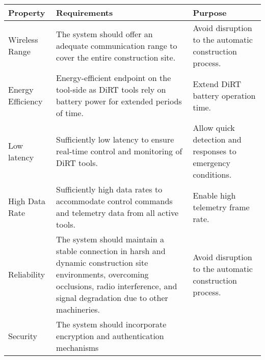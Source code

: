 \begin{table}[H]
\begin{adjustbox}{max width=\textwidth}
\begin{tabular}{p{2.33cm}p{8.25cm}p{5.34cm}}
\hline
\multicolumn{1}{|p{2.33cm}}{{\footnotesize \textbf{Property}}} & 
\multicolumn{1}{|p{8.25cm}}{{\footnotesize \textbf{Requirements}}} & 
\multicolumn{1}{|p{5.34cm}|}{{\footnotesize \textbf{Purpose}}} \\ 
\hline
\multicolumn{1}{|p{2.33cm}}{{\footnotesize Wireless Range}} & 
\multicolumn{1}{|p{8.25cm}}{{\footnotesize The system should offer an adequate communication range to cover the entire construction site. }} & 
\multicolumn{1}{|p{5.34cm}|}{{\footnotesize Avoid disruption to the automatic construction process.}} \\ 
\hline
\multicolumn{1}{|p{2.33cm}}{{\footnotesize Energy Efficiency}} & 
\multicolumn{1}{|p{8.25cm}}{{\footnotesize Energy-efficient endpoint on the tool-side as DiRT tools rely on battery power for extended periods of time.\par}} & 
\multicolumn{1}{|p{5.34cm}|}{{\footnotesize Extend DiRT battery operation time.}} \\ 
\hline
\multicolumn{1}{|p{2.33cm}}{{\footnotesize Low latency}} & 
\multicolumn{1}{|p{8.25cm}}{{\footnotesize Sufficiently low latency to ensure real-time control and monitoring of DiRT tools.}} & 
\multicolumn{1}{|p{5.34cm}|}{{\footnotesize Allow quick detection and responses to emergency conditions.}} \\ 
\hline
\multicolumn{1}{|p{2.33cm}}{{\footnotesize High Data Rate}} & 
\multicolumn{1}{|p{8.25cm}}{{\footnotesize Sufficiently high data rates to accommodate control commands and telemetry data from all active tools.\par}} & 
\multicolumn{1}{|p{5.34cm}|}{{\footnotesize Enable high telemetry frame rate.}} \\ 
\hline
\multicolumn{1}{|p{2.33cm}}{{\footnotesize Reliability}} & 
\multicolumn{1}{|p{8.25cm}}{{\footnotesize The system should maintain a stable connection in harsh and dynamic construction site environments, overcoming occlusions, radio interference, and signal degradation due to other machineries.\par}} & 
\multicolumn{1}{|p{5.34cm}|}{{\footnotesize Avoid disruption to the automatic construction process.}} \\ 
\hline
\multicolumn{1}{|p{2.33cm}}{{\footnotesize Security}} & 
\multicolumn{1}{|p{8.25cm}}{{\footnotesize The system should incorporate encryption and authentication mechanisms }} & 

\end{tabular}
\end{adjustbox}
\end{table}

